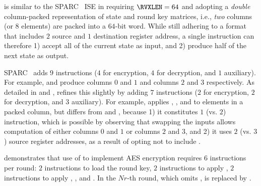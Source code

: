 
is similar to the SPARC~\cite[Page 109]{SPARC:16} ISE in
requiring
$\RVXLEN = 64$
and adopting a 
{\em double}
column-packed 
representation of state and round key matrices,
i.e., {\em two} columns (or $8$ elements) are packed into a $64$-bit word.
While still adhering to a format that
includes $2$ source and $1$ destination register address,
a single instruction can therefore 
1) accept  all  of the current state as  input,
   and
2) produce half of the next    state as output.

SPARC~\cite[Page 109]{SPARC:16}
adds
$ 9$
instructions ($4$ for encryption, $4$ for decryption, and $1$ auxiliary).
For example,
and
produce
columns $0$ and $1$
and
columns $2$ and $3$
respectively.
As detailed in
and
,
refines this slightly by 
adding 
$ 7$
instructions ($2$ for encryption, $2$ for decryption, and $3$ auxiliary).
For example,
applies
, , and   
to elements in   a packed column,
but differs from 
and
,
because
1) it constitutes
   $1$ (vs. $2$)
   instruction,
   which is possible by observing that swapping the inputs allows 
   computation of either 
   columns $0$ and $1$ 
   or 
   columns $2$ and $3$,
   and
2) it uses 
   $2$ (vs. $3$)
   source register addresses, 
   as a result of opting not to include
   .

demonstrates that use of  to implement AES encryption requires
$ 6$ instructions per round:
$ 2$            
     instructions to load the round key,
$ 2$            
     instructions to apply ,
$ 2$   
     instructions to apply , , and .
In the $Nr$-th round, which omits ,
is replaced by 
     .

